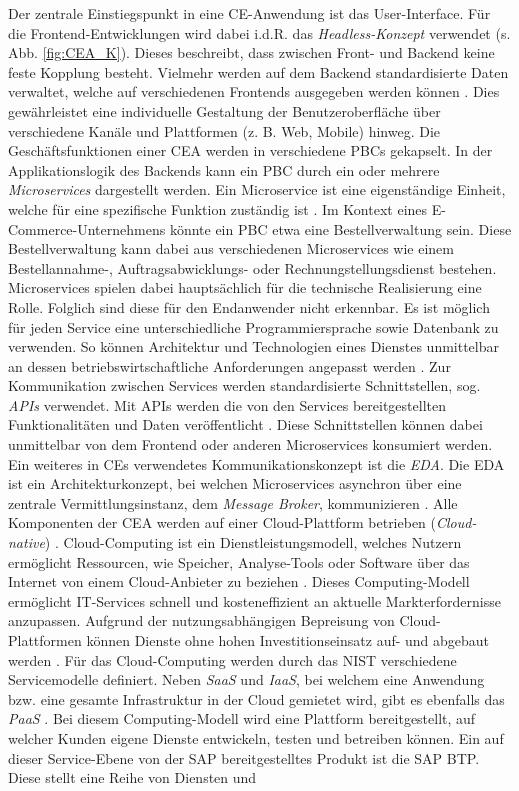 Der zentrale Einstiegspunkt in eine CE-Anwendung ist das User-Interface. Für die Frontend-Entwicklungen wird dabei i.d.R. das \textit{Headless-Konzept} verwendet (s. Abb. \ref{fig:CEA_K}). Dieses beschreibt, dass zwischen Front- und Backend keine feste Kopplung besteht. Vielmehr werden auf dem Backend standardisierte Daten verwaltet, welche auf verschiedenen Frontends ausgegeben werden können \cite[4]{Attardi.2020b}. Dies gewährleistet eine individuelle Gestaltung der Benutzeroberfläche über verschiedene Kanäle und Plattformen (z. B. Web, Mobile) hinweg. Die Geschäftsfunktionen einer CEA werden in verschiedene PBCs gekapselt. In der Applikationslogik des Backends kann ein PBC durch ein oder mehrere \textit{Microservices} dargestellt werden. Ein Microservice ist eine eigenständige Einheit, welche für eine spezifische Funktion zuständig ist \cite[S. 93 ff.]{Lauretis.1027201910302019}. Im Kontext eines E-Commerce-Unternehmens könnte ein PBC etwa eine Bestellverwaltung sein. Diese Bestellverwaltung kann dabei aus verschiedenen Microservices wie einem Bestellannahme-, Auftragsabwicklungs- oder Rechnungstellungsdienst bestehen. Microservices spielen dabei hauptsächlich für die technische Realisierung eine Rolle. Folglich sind diese für den Endanwender nicht erkennbar. Es ist möglich für jeden Service eine unterschiedliche Programmiersprache sowie Datenbank zu verwenden. So können Architektur und Technologien eines Dienstes unmittelbar an dessen betriebswirtschaftliche Anforderungen angepasst werden \cite[42]{Balalaie.2016}. Zur Kommunikation zwischen Services werden standardisierte Schnittstellen, sog. \textit{\ac*{APIs}} verwendet. Mit APIs werden die von den Services bereitgestellten Funktionalitäten und Daten veröffentlicht \cite[15]{Biehl.2015}. Diese Schnittstellen können dabei unmittelbar von dem Frontend oder anderen Microservices konsumiert werden. Ein weiteres in CEs verwendetes Kommunikationskonzept ist die \textit{\ac{EDA}}. Die EDA ist ein Architekturkonzept, bei welchen Microservices asynchron über eine zentrale Vermittlungsinstanz, dem \textit{Message Broker}, kommunizieren \cite[54]{Bruns.2010}. Alle Komponenten der CEA werden auf einer Cloud-Plattform betrieben (\textit{Cloud-native}) \cite[3]{Kratzke.2017}. Cloud-Computing ist ein Dienstleistungsmodell, welches Nutzern ermöglicht Ressourcen, wie Speicher, Analyse-Tools oder Software über das Internet von einem Cloud-Anbieter zu beziehen \cite[5]{Reinheimer.2018}. Dieses Computing-Modell ermöglicht IT-Services schnell und kosteneffizient an aktuelle Markterfordernisse anzupassen. Aufgrund der nutzungsabhängigen Bepreisung von Cloud-Plattformen können Dienste ohne hohen Investitionseinsatz auf- und abgebaut werden \cite[10]{Reinheimer.2018}. Für das Cloud-Computing werden durch das \ac{NIST} verschiedene Servicemodelle definiert. Neben \textit{\ac{SaaS}} und \textit{\ac{IaaS}}, bei welchem eine Anwendung bzw. eine gesamte Infrastruktur in der Cloud gemietet wird, gibt es ebenfalls das \textit{\ac{PaaS}} \cite{Reinheimer.2018} \cite[9]{Reinheimer.2018}. Bei diesem Computing-Modell wird eine Plattform bereitgestellt, auf welcher Kunden eigene Dienste entwickeln, testen und betreiben können. Ein auf dieser Service-Ebene von der SAP bereitgestelltes Produkt ist die \ac{SAP BTP}. Diese stellt eine Reihe von Diensten und 